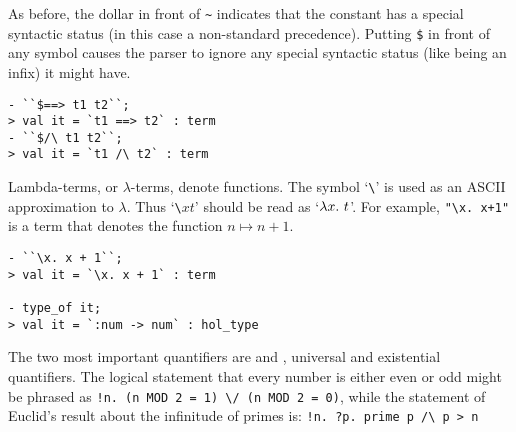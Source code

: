     As before, the dollar in front of {\small\verb|~|} indicates that
    the constant has a special syntactic status (in this case a
    non-standard precedence). Putting {\small\verb|$|} in front of any
    symbol causes the parser to ignore any special syntactic status
    (like being an infix) it might have.

\begin{session}\begin{verbatim}
- ``$==> t1 t2``;
> val it = `t1 ==> t2` : term
- ``$/\ t1 t2``;
> val it = `t1 /\ t2` : term
\end{verbatim}\end{session}

    Lambda-terms, or $\lambda$-terms, denote functions. The symbol
    `{\small\verb|\|}' is used as an {\small ASCII} approximation to
    $\lambda$.  Thus `{\small\verb|\|}$x$$t$' should be read as
    `$\lambda x.\ t$'. For example, {\small\verb|"\x. x+1"|} is a term
    that denotes the function $n\mapsto n{+}1$.

\begin{session}\begin{verbatim}
- ``\x. x + 1``;
> val it = `\x. x + 1` : term

- type_of it;
> val it = `:num -> num` : hol_type
\end{verbatim}\end{session}

The two most important quantifiers are \ml{!} and , universal
and existential quantifiers.  The logical statement that every number
is either even or odd might be phrased as
{\small\verb|!n. (n MOD 2 = 1) \/ (n MOD 2 = 0)|}, while the statement
of Euclid's result about the infinitude of primes is:
{\small\verb|!n. ?p. prime p /\ p > n|}







